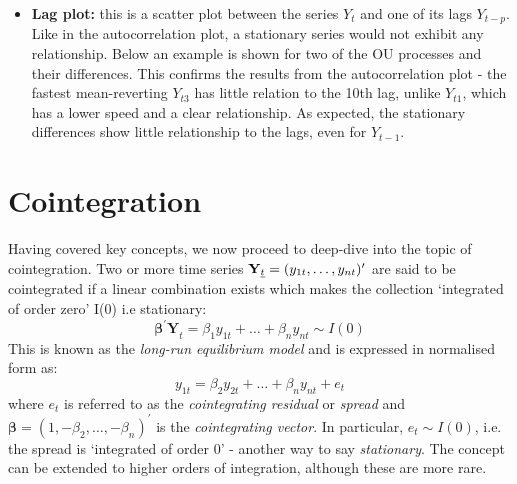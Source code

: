 \documentclass[11pt]{article}
\providecommand{\tightlist}{%
      \setlength{\itemsep}{0pt}\setlength{\parskip}{0pt}}
\begin{document}
    \begin{center}
    \end{center}


    \begin{itemize}
\tightlist
\item
  \textbf{Lag plot:} this is a scatter plot between the series \(Y_t\)
  and one of its lags \(Y_{t-p}\). Like in the autocorrelation plot, a
  stationary series would not exhibit any relationship. Below an example
  is shown for two of the OU processes and their differences. This
  confirms the results from the autocorrelation plot - the fastest
  mean-reverting $Y_{t3}$ has little relation to the 10th lag, unlike $Y_{t1}$,
  which has a lower speed and a clear relationship. As expected, the stationary differences show little relationship  to the lags, even for \(Y_{t-1}\).
\end{itemize}
    \begin{center}
    \end{center}
        
    \section{Cointegration}\label{cointegration}
    Having covered  key concepts, we now proceed to  deep-dive into the topic of cointegration.
Two or more time series $\mathbf{Y}_{\emph{t}} = (y_{1t}, \dots,
y_{nt})^{\prime} $ are said to be cointegrated if a linear
combination exists which makes the collection `integrated of order
zero' I(0) i.e stationary:
\begin{equation}
\mathbf{\beta^\prime Y}_t = \beta_1 y_{1t} + \dots + \beta_n y_{nt} \sim I(0)
\end{equation}
This is known as the \emph{long-run equilibrium model} and is
expressed in normalised form as:
\begin{equation}
y_{1t} = \beta_2 y_{2t} + \dots + \beta_n y_{nt} + e_t
\end{equation}
where  \(e_t \) is referred to as the
\emph{cointegrating residual} or {\em spread} and
\(\mathbf{\beta} = (1, -\beta_2, \dots, -\beta_n)^\prime\) is the
\emph{cointegrating vector}. In particular,  \(e_t \sim I(0)\), i.e. the spread is `integrated of order 0' - another way to say {\em stationary}. The  concept can be extended to higher orders of integration, although these are more rare.
\end{document}
